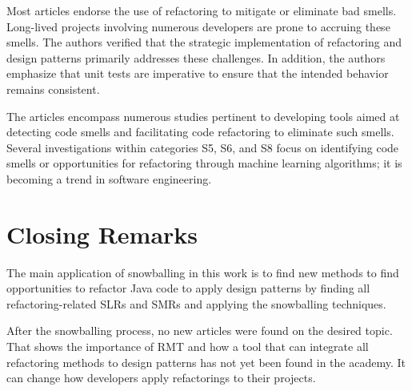 Most articles endorse the use of refactoring to mitigate or eliminate bad smells. Long-lived projects involving numerous developers are prone to accruing these smells. The authors verified that the strategic implementation of refactoring and design patterns primarily addresses these challenges. In addition, the authors emphasize that unit tests are imperative to ensure that the intended behavior remains consistent.

The articles encompass numerous studies pertinent to developing tools aimed at detecting code smells and facilitating code refactoring to eliminate such smells. Several investigations within categories S5, S6, and S8 focus on identifying code smells or opportunities for refactoring through machine learning algorithms; it is becoming a trend in software engineering.

\section{Closing Remarks}
\label{sec-cloasing-remarks}

The main application of snowballing in this work is to find new methods to find opportunities to refactor Java code to apply design patterns by finding all refactoring-related SLRs and SMRs and applying the snowballing techniques. 

After the snowballing process, no new articles were found on the desired topic. That shows the importance of RMT and how a tool that can integrate all refactoring methods to design patterns has not yet been found in the academy. It can change how developers apply refactorings to their projects.